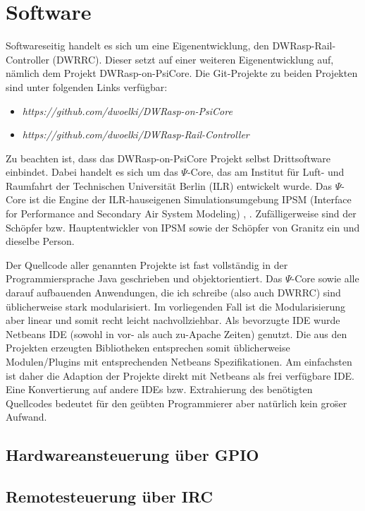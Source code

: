 \section{Software}
\label{sec:software}

Softwareseitig handelt es sich um eine Eigenentwicklung, den DWRasp-Rail-Controller (DWRRC).
Dieser setzt auf einer weiteren Eigenentwicklung auf, n\"amlich dem Projekt DWRasp-on-PsiCore.
Die Git-Projekte zu beiden Projekten sind unter folgenden Links verf\"ugbar:
\begin{itemize}
	\item \textit{https://github.com/dwoelki/DWRasp-on-PsiCore}
	\item \textit{https://github.com/dwoelki/DWRasp-Rail-Controller}
\end{itemize}
Zu beachten ist, dass das DWRasp-on-PsiCore Projekt selbst Drittsoftware einbindet.
Dabei handelt es sich um das $\Psi$-Core, das am Institut f\"ur Luft- und Raumfahrt der Technischen Universit\"at Berlin (ILR) entwickelt wurde.
Das $\Psi$-Core ist die Engine der ILR-hauseigenen Simulationsumgebung IPSM (Interface for Performance and Secondary Air System Modeling) \cite{Woe14}, \cite{Woe19c}.
Zuf\"alligerweise sind der Sch\"opfer bzw. Hauptentwickler von IPSM sowie der Sch\"opfer von Granitz ein und dieselbe Person.

Der Quellcode aller genannten Projekte ist fast vollst\"andig in der Programmiersprache Java geschrieben und objektorientiert.
Das $\Psi$-Core sowie alle darauf aufbauenden Anwendungen, die ich schreibe (also auch DWRRC) sind \"ublicherweise stark modularisiert.
Im vorliegenden Fall ist die Modularisierung aber linear und somit recht leicht nachvollziehbar.
Als bevorzugte IDE wurde Netbeans IDE (sowohl in vor- als auch zu-Apache Zeiten) genutzt.
Die aus den Projekten erzeugten Bibliotheken entsprechen somit \"ublicherweise Modulen/Plugins mit entsprechenden Netbeans Spezifikationen.
Am einfachsten ist daher die Adaption der Projekte direkt mit Netbeans als frei verf\"ugbare IDE.
Eine Konvertierung auf andere IDEs bzw. Extrahierung des ben\"otigten Quellcodes bedeutet f\"ur den ge\"ubten Programmierer aber nat\"urlich kein gro\"ser Aufwand.





\subsection{Hardwareansteuerung \"uber GPIO}
\label{sec:gpio}



\subsection{Remotesteuerung \"uber IRC}
\label{sec:remote_irc}